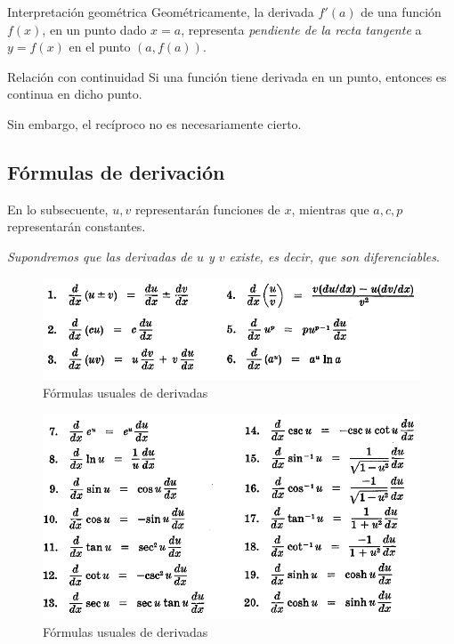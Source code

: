 {Interpretación geométrica}
  Geométricamente, la derivada $f'(a)$ de una función $f(x)$, en un punto dado $x=a$, representa \emph{pendiente de la recta tangente} a $y=f(x)$ en el punto $\left( a,f(a) \right)$.

{Relación con continuidad}
  Si una función tiene derivada en un punto, entonces es continua en dicho punto. 
  
  Sin embargo, el recíproco no es necesariamente cierto. 

\subsection{Fórmulas de derivación}
{}
  En lo subsecuente, $u,v$ representarán funciones de $x$, mientras que $a,c,p$ representarán constantes.   


  \emph{Supondremos que las derivadas de $u$ y $v$ existe, es decir, que son diferenciables}. 

{}
  \begin{figure}
 \centering
 \includegraphics[width=.7\textwidth,keepaspectratio=true]{./calculo/formulas_derivadas_01.png}
 \caption{Fórmulas usuales de derivadas}
 \label{fig:formulas_derivadas_01}
\end{figure}


{}
  \begin{figure}
 \centering
 \includegraphics[width=.7\textwidth,keepaspectratio=true]{./calculo/formulas_derivadas_02.png}
 \caption{Fórmulas usuales de derivadas}
 \label{fig:formulas_derivadas_02}
\end{figure}


